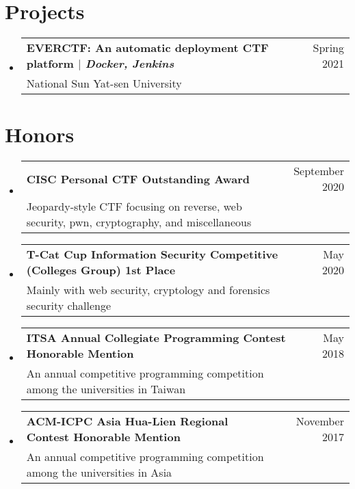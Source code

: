 \documentclass[A4,11pt]{article}
\makeatletter
\newcommand{\CVSubheading}[4]{
  \vspace{-2pt}\item
    \begin{tabular*}{0.97\textwidth}[t]{l@{\extracolsep{\fill}}r}
      \textbf{#1} & #2 \\
      \small#3 & \small #4 \\
    \end{tabular*}\vspace{-7pt}
}
\newcommand{\CVSubHeadingListStart}{\begin{itemize}[leftmargin=0.5cm, label={}]}
\newcommand{\CVSubHeadingListEnd}{\end{itemize}}
\makeatother
\begin{document}
\begin{comment}
  Ideally the title of the work should speak for what it is. However if you feel
  like you should explain more about why the project is applicable to this job,
  use item list as is shown in the work experience section.
  \end{comment}
  
  \section{Projects}
    \CVSubHeadingListStart
      \CVSubheading
        {EVERCTF: An automatic deployment CTF platform $|$ \emph{\small{Docker, Jenkins}}}{Spring 2021}
        {National Sun Yat-sen University}{}
    \CVSubHeadingListEnd

\begin{comment}
Again the title should have already been enough, but if it is necessary to add
descriptions maintain the consistency from prior sections
\end{comment}


\section{Honors}
  \CVSubHeadingListStart
    \CVSubheading
      {CISC Personal CTF Outstanding Award}{September 2020}
      {Jeopardy-style CTF focusing on reverse, web security, pwn, cryptography, and miscellaneous}{}
    \CVSubheading
      {T-Cat Cup Information Security Competitive (Colleges Group) 1st Place}{May 2020}
      {Mainly with web security, cryptology and forensics security challenge}{}
    \CVSubheading
      {ITSA Annual Collegiate Programming Contest Honorable Mention}{May 2018}
      {An annual competitive programming competition among the universities in Taiwan}{}
    \CVSubheading
      {ACM-ICPC Asia Hua-Lien Regional Contest Honorable Mention}{November 2017}
      {An annual competitive programming competition among the universities in Asia}{}
  \CVSubHeadingListEnd
\end{document}
